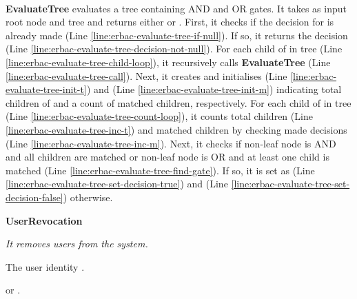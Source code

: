 \documentclass[epsfig,a4paper,11pt,titlepage]{book}
\numberwithin{algorithm}{chapter}
\newcommand{\algofontsize}{\fontsize{11}{12}\selectfont}
\begin{document}
\noindent \\
\noindent \textbf{EvaluateTree} evaluates a tree containing AND and OR gates. It takes as input root node  and tree  and returns either  or . First, it checks if the decision for  is already made (Line \ref{line:erbac-evaluate-tree-if-null}). If so, it returns the decision (Line \ref{line:erbac-evaluate-tree-decision-not-null}). For each child  of  in tree  (Line \ref{line:erbac-evaluate-tree-child-loop}), it recursively calls \textbf{EvaluateTree} (Line \ref{line:erbac-evaluate-tree-call}). Next, it creates and initialises  (Line \ref{line:erbac-evaluate-tree-init-t}) and  (Line \ref{line:erbac-evaluate-tree-init-m}) indicating total children of  and a count of matched children, respectively. For each child  of  in tree  (Line \ref{line:erbac-evaluate-tree-count-loop}), it counts total children (Line \ref{line:erbac-evaluate-tree-inc-t}) and matched children by checking made decisions (Line \ref{line:erbac-evaluate-tree-inc-m}). Next, it checks if non-leaf node is AND and all children are matched or non-leaf node is OR and at least one child is matched (Line \ref{line:erbac-evaluate-tree-find-gate}). If so, it is set as  (Line \ref{line:erbac-evaluate-tree-set-decision-true}) and  (Line \ref{line:erbac-evaluate-tree-set-decision-false}) otherwise.




\begin{algorithm} [htp]
{\algofontsize
\caption{\textbf{UserRevocation}}

\label{algo:egrant-user-revocation}

\begin{algorithmic}[1]

\INPUT \emph{It removes users from the system.}

\Require The user identity .

\Ensure  or .

\medskip

\If {} \label{line:egrant-user-presence}

	\Return  \label{line:egrant-no-user-present}

\EndIf

\State  \label{line:egrant-get-user-key}
\State  \label{line:egrant-remove-user-key}

\Return  \label{line:egrant-user-removed-successfully}

\end{algorithmic}
}
\end{algorithm}
\end{document}

